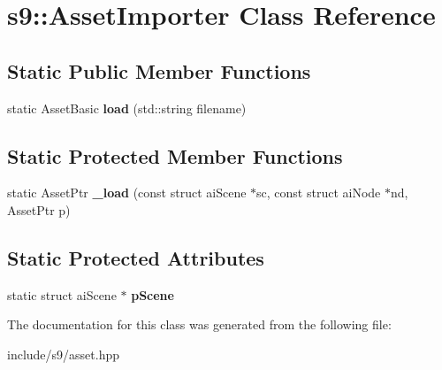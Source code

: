 \hypertarget{classs9_1_1AssetImporter}{\section{s9\-:\-:Asset\-Importer Class Reference}
\label{classs9_1_1AssetImporter}
}
\subsection*{Static Public Member Functions}
\begin{DoxyCompactItemize}
\item 
\hypertarget{classs9_1_1AssetImporter_a3aed72cd6c982c40a4002a96f9825777}{static Asset\-Basic {\bfseries load} (std\-::string filename)}\label{classs9_1_1AssetImporter_a3aed72cd6c982c40a4002a96f9825777}

\end{DoxyCompactItemize}
\subsection*{Static Protected Member Functions}
\begin{DoxyCompactItemize}
\item 
\hypertarget{classs9_1_1AssetImporter_a46925d052ba1f12b487610fcb1f1e70b}{static Asset\-Ptr {\bfseries \-\_\-load} (const struct ai\-Scene $\ast$sc, const struct ai\-Node $\ast$nd, Asset\-Ptr p)}\label{classs9_1_1AssetImporter_a46925d052ba1f12b487610fcb1f1e70b}

\end{DoxyCompactItemize}
\subsection*{Static Protected Attributes}
\begin{DoxyCompactItemize}
\item 
\hypertarget{classs9_1_1AssetImporter_a6c0a48dbb30f5dd3dd887b7f50db5f27}{static struct ai\-Scene $\ast$ {\bfseries p\-Scene}}\label{classs9_1_1AssetImporter_a6c0a48dbb30f5dd3dd887b7f50db5f27}

\end{DoxyCompactItemize}


The documentation for this class was generated from the following file\-:\begin{DoxyCompactItemize}
\item 
include/s9/asset.\-hpp\end{DoxyCompactItemize}
